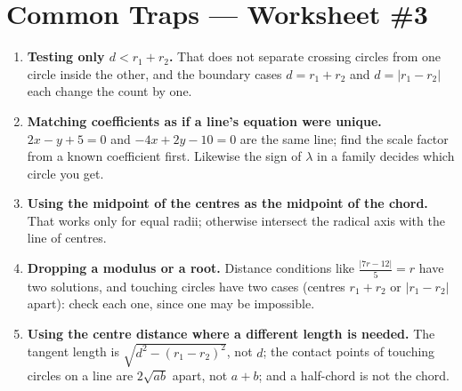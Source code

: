 \documentclass[11pt,a4paper]{article}
\begin{document}
\section*{Common Traps --- Worksheet \#3}
\begin{enumerate}[leftmargin=2em, itemsep=4pt]
  \item \textbf{Testing only $d<r_1+r_2$.} That does not separate crossing circles from one circle inside the other, and the boundary cases $d=r_1+r_2$ and $d=|r_1-r_2|$ each change the count by one. 
  \item \textbf{Matching coefficients as if a line's equation were unique.} $2x-y+5=0$ and $-4x+2y-10=0$ are the same line; find the scale factor from a known coefficient first. Likewise the sign of $\lambda$ in a family decides which circle you get. 
  \item \textbf{Using the midpoint of the centres as the midpoint of the chord.} That works only for equal radii; otherwise intersect the radical axis with the line of centres. 
  \item \textbf{Dropping a modulus or a root.} Distance conditions like $\tfrac{|7r-12|}{5}=r$ have two solutions, and touching circles have two cases (centres $r_1+r_2$ or $|r_1-r_2|$ apart): check each one, since one may be impossible. 
  \item \textbf{Using the centre distance where a different length is needed.} The tangent length is $\sqrt{d^2-(r_1-r_2)^2}$, not $d$; the contact points of touching circles on a line are $2\sqrt{ab}$ apart, not $a+b$; and a half-chord is not the chord. 
\end{enumerate}

\end{document}
